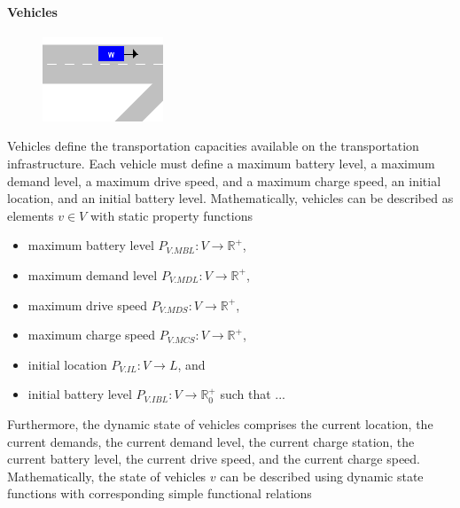 \documentclass[graybox]{svmult}
\begin{document}
\paragraph{Vehicles}
\begin{figure}
	\begin{center}
		\includegraphics[scale=0.5]{../../concepts/vehicle.png}
	\end{center}
\end{figure}
Vehicles define the transportation capacities available on the transportation infrastructure.
Each vehicle must define a maximum battery level, a maximum demand level, a maximum drive speed, and a maximum charge speed, an initial location, and an initial battery level.
Mathematically, vehicles can be described as elements $v \in V$ with static property functions
\begin{itemize}
	\item maximum battery level $P_{V.MBL}: V \rightarrow \mathbb{R}^+$,
	\item maximum demand level $P_{V.MDL}: V \rightarrow \mathbb{R}^+$,
	\item maximum drive speed $P_{V.MDS}: V \rightarrow \mathbb{R}^+$,
	\item maximum charge speed $P_{V.MCS}: V \rightarrow \mathbb{R}^+$,
	\item initial location $P_{V.IL}: V \rightarrow L$, and
	\item initial battery level $P_{V.IBL}: V \rightarrow \mathbb{R}_0^+$ such that ...
\end{itemize}
Furthermore, the dynamic state of vehicles comprises the current location, the current demands, the current demand level, the current charge station, the current battery level, the current drive speed, and the current charge speed.
Mathematically, the state of vehicles $v$ can be described using dynamic state functions with corresponding simple functional relations
\end{document}
